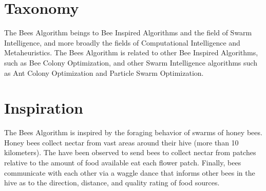 \documentclass[a4paper, 11pt]{article}
\begin{document}
\section{Taxonomy}
\label{sec:taxonomy}
The Bees Algorithm beings to Bee Inspired Algorithms and the field of Swarm Intelligence, and more broadly the fields of Computational Intelligence and Metaheuristics.
The Bees Algorithm is related to other Bee Inspired Algorithms, such as Bee Colony Optimization, and other Swarm Intelligence algorithms such as Ant Colony Optimization and Particle Swarm Optimization.

\section{Inspiration}
\label{sec:inspiration}
The Bees Algorithm is inspired by the foraging behavior of swarms of honey bees.
Honey bees collect nectar from vast areas around their hive (more than 10 kilometers). The have been observed to send bees to collect nectar from patches relative to the amount of food available eat each flower patch.
Finally, bees communicate with each other via a waggle dance that informs other bees in the hive as to the direction, distance, and quality rating of food sources.
\end{document}
